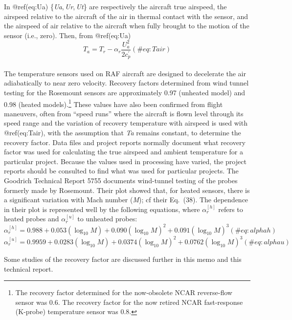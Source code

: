 \documentclass[
  english,
]{book}
\begin{document}
In @ref(eq:Ua)
{\{\emph{U}\emph{a}, \emph{U}\emph{r}, \emph{U}\emph{t}\}} are
respectively the aircraft true airspeed, the airspeed relative to the
aircraft of the air in thermal contact with the sensor, and the airspeed
of air relative to the aircraft when fully brought to the motion of the
sensor (i.e., zero). Then, from @ref(eq:Ua) \begin{equation}
T_{a}=T_{r}-\alpha_{r}\frac{U_{a}^{2}}{2c_{p}^{\prime}}
(\#eq:Tair)
\end{equation}\\
The temperature sensors used on RAF aircraft are designed to decelerate
the air adiabatically to near zero velocity. Recovery factors determined
from wind tunnel testing for the Rosemount sensors are approximately
0.97 (unheated model) and 0.98 (heated models).\footnote{The recovery
  factor determined for the now-obsolete NCAR reverse-flow sensor was
  0.6. The recovery factor for the now retired NCAR fast-response
  (K-probe) temperature sensor was 0.8.} These values have also been
confirmed from flight maneuvers, often from ``speed runs'' where the
aircraft is flown level through its speed range and the variation of
recovery temperature with airspeed is used with @ref(eq:Tair), with the
assumption that {\emph{T}\emph{a}} remains constant, to determine the
recovery factor. Data files and project reports normally document what
recovery factor was used for calculating the true airspeed and ambient
temperature for a particular project. Because the values used in
processing have varied, the project reports should be consulted to find
what was used for particular projects. The Goodrich Technical Report
5755 documents wind-tunnel testing of the probes formerly made by
Rosemount. Their plot showed that, for heated sensors, there is a
significant variation with Mach number ({\emph{M}}); cf their Eq.~(38).
The dependence in their plot is represented well by the following
equations, where \(\alpha_r^{[h]}\) refers to heated probes and
\(\alpha_r^{[u]}\) to unheated probes:\\
\begin{equation}
\alpha_r^{[h]} = 0.988+0.053(\log_{10}M)+0.090(\log_{10}M)^2+0.091(\log_{10}M)^3
(\#eq:alphah)
\end{equation} \begin{equation}
\alpha_r^{[u]}=0.9959+0.0283(\log_{10}M)+0.0374(\log_{10}M)^2+0.0762(\log_{10}M)^3
(\#eq:alphau)
\end{equation}

Some studies of the recovery factor are discussed further in this memo
and this technical report.
\end{document}
